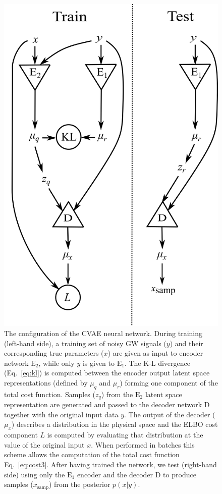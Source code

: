 \begin{figure}
    \includegraphics[width=\columnwidth]{network_setup.png}
    \caption[The configuration of the \ac{CVAE} \texttt{VItamin}
neural network.]{\label{fig:network_config} The configuration of the \ac{CVAE}
neural network. During training (left-hand side), a training set of noisy
\ac{GW} signals ($y$) and their corresponding true parameters ($x$) are given
as input to encoder network $\textrm{E}_2$, while only $y$ is given to
$\textrm{E}_1$.  The K-L divergence (Eq.~\ref{eq:kl}) is computed between the
encoder output latent space representations (defined by $\mu_q$ and $\mu_r$)
forming one component of the total cost function.  Samples ($z_q$) from the
$\text{E}_{2}$ latent space representation are generated and passed to the
decoder network D together with the original input data $y$. The output of the
decoder ($\mu_x$) describes a distribution in the physical space and the
\ac{ELBO} cost component $L$ is computed by evaluating that distribution at the
value of the original input $x$. When performed in batches this scheme allows
the computation of the total cost function Eq.~\ref{eq:cost3}. After having
trained the network, we test (right-hand side) using only the $\textrm{E}_1$
encoder and the decoder D to produce samples ($x_{\text{samp}}$) from the
posterior $p(x|y)$.}
\end{figure}

